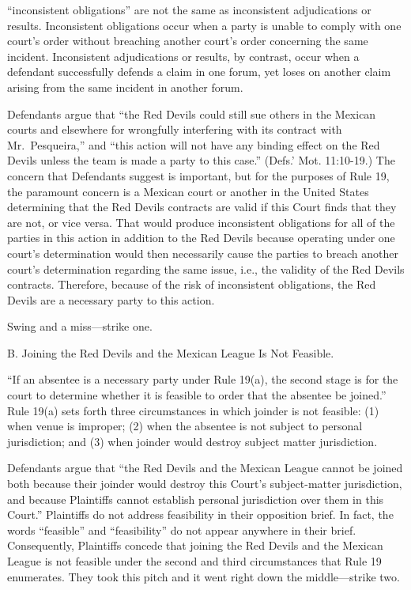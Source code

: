 \documentclass[11pt,letterpaper,twoside]{article}
\renewenvironment{quote}{%
   \list{}{%
     \leftmargin2em   %
     \rightmargin\leftmargin\parsep .1em }
   \item\relax
}
{\endlist}
\begin{document}
\begin{quote}
``inconsistent obligations'' are not the same as inconsistent
adjudications or results. Inconsistent obligations occur when a party is
unable to comply with one court's order without breaching another
court's order concerning the same incident. Inconsistent adjudications
or results, by contrast, occur when a defendant successfully defends a
claim in one forum, yet loses on another claim arising from the same
incident in another forum.
\end{quote}

Defendants argue that ``the Red Devils could still sue others in the
Mexican courts and elsewhere for wrongfully interfering with its
contract with Mr.~Pesqueira,'' and ``this action will not have any
binding effect on the Red Devils unless the team is made a party to this
case.'' (Defs.' Mot. 11:10-19.) The concern that Defendants suggest is
important, but for the purposes of Rule 19, the paramount concern is a
Mexican court or another in the United States determining that the Red
Devils contracts are valid if this Court finds that they are not, or
vice versa. That would produce inconsistent obligations for all of the
parties in this action in addition to the Red Devils because operating
under one court's determination would then necessarily cause the parties
to breach another court's determination regarding the same issue, i.e.,
the validity of the Red Devils contracts. Therefore, because of the risk
of inconsistent obligations, the Red Devils are a necessary party to
this action.

Swing and a miss---strike one.

{B. Joining the Red Devils and the Mexican League Is Not Feasible.}

``If an absentee is a necessary party under Rule 19(a), the second stage
is for the court to determine whether it is feasible to order that the
absentee be joined.'' Rule 19(a) sets forth three circumstances in which
joinder is not feasible: (1) when venue is improper; (2) when the
absentee is not subject to personal jurisdiction; and (3) when joinder
would destroy subject matter jurisdiction.

Defendants argue that ``the Red Devils and the Mexican League cannot be
joined both because their joinder would destroy this Court's
subject-matter jurisdiction, and because Plaintiffs cannot establish
personal jurisdiction over them in this Court.'' Plaintiffs do not
address feasibility in their opposition brief. In fact, the words
``feasible'' and ``feasibility'' do not appear anywhere in their brief.
Consequently, Plaintiffs concede that joining the Red Devils and the
Mexican League is not feasible under the second and third circumstances
that Rule 19 enumerates. They took this pitch and it went right down the
middle---strike two.
\end{document}
